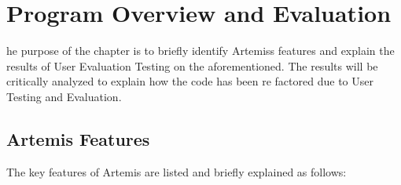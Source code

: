 %
%
\let\textcircled=\pgftextcircled
\chapter{Program Overview and Evaluation}
\label{chap:Overview and Evaluation}







he purpose of the chapter is to briefly identify Artemis\textquotesingle s features and explain the results of User Evaluation Testing on the aforementioned. The results will be critically analyzed to explain how the code has been re factored due to User Testing and Evaluation. 


\section{Artemis Features}

The key features of Artemis are listed and briefly explained as follows:


